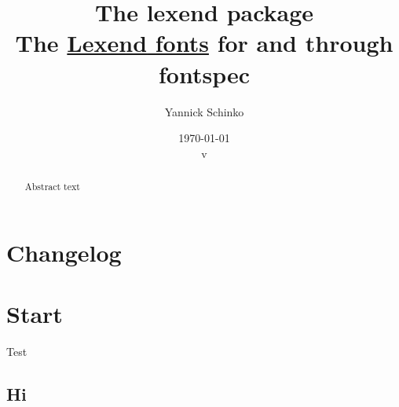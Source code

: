 \documentclass[12pt,oneside,a4paper]{ltxdoc}
\begin{document}
\title{
	The \textsf{lexend} package\\
	\small{The \href{https://www.lexend.com/}{\textsf{Lexend} fonts} for  and
	 through \textsf{fontspec}}
}
\author{
	Yannick Schinko
}
\date{
	\today\\
	v%
}

\maketitle

\bigskip

\begin{abstract}
Abstract text
\end{abstract}

\bigskip
\tableofcontents
\newpage


\section{Changelog}


\section{Start}

Test

\subsection{Hi}
\end{document}
